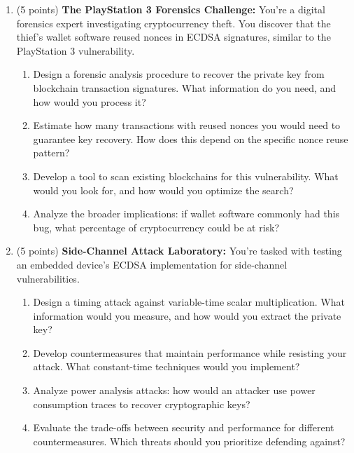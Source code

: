 \documentclass[10pt,a4paper,american]{exam}
\begin{document}
\begin{enumerate}
	\item (5 points) \textbf{The PlayStation 3 Forensics Challenge:}
	      You're a digital forensics expert investigating cryptocurrency theft. You discover that the thief's wallet software reused nonces in ECDSA signatures, similar to the PlayStation 3 vulnerability.
	      \begin{enumerate}
		      \item Design a forensic analysis procedure to recover the private key from blockchain transaction signatures. What information do you need, and how would you process it?
		      \item Estimate how many transactions with reused nonces you would need to guarantee key recovery. How does this depend on the specific nonce reuse pattern?
		      \item Develop a tool to scan existing blockchains for this vulnerability. What would you look for, and how would you optimize the search?
		      \item Analyze the broader implications: if wallet software commonly had this bug, what percentage of cryptocurrency could be at risk?
	      \end{enumerate}

	\item (5 points) \textbf{Side-Channel Attack Laboratory:}
	      You're tasked with testing an embedded device's ECDSA implementation for side-channel vulnerabilities.
	      \begin{enumerate}
		      \item Design a timing attack against variable-time scalar multiplication. What information would you measure, and how would you extract the private key?
		      \item Develop countermeasures that maintain performance while resisting your attack. What constant-time techniques would you implement?
		      \item Analyze power analysis attacks: how would an attacker use power consumption traces to recover cryptographic keys?
		      \item Evaluate the trade-offs between security and performance for different countermeasures. Which threats should you prioritize defending against?
	      \end{enumerate}


\end{enumerate}
\end{document}
